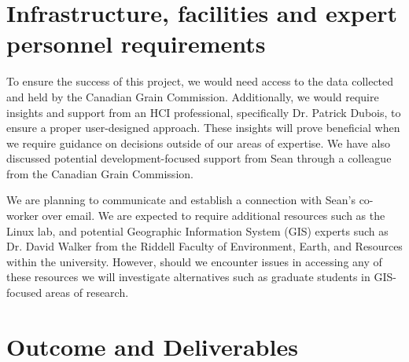 \documentclass[12pt]{article}
\begin{document}
\section*{Infrastructure, facilities and expert personnel requirements}

To ensure the success of this project, we would need access to the data collected and held by the Canadian Grain Commission. Additionally, we would require insights and support from an HCI professional, specifically Dr. Patrick Dubois, to ensure a proper user-designed approach. These insights will prove beneficial when we require guidance on decisions outside of our areas of expertise. We have also discussed potential development-focused support from Sean through a colleague from the Canadian Grain Commission. 

We are planning to communicate and establish a connection with Sean’s co-worker over email. We are expected to require additional resources such as the Linux lab, and potential Geographic Information System (GIS) experts such as Dr. David Walker from the Riddell Faculty of Environment, Earth, and Resources within the university. However, should we encounter issues in accessing any of these resources we will investigate alternatives such as graduate students in GIS-focused areas of research.   

\section*{Outcome and Deliverables}
\end{document}
